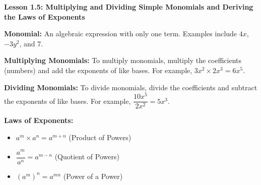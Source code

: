 \begin{center}
\textbf{Lesson 1.5: Multiplying and Dividing Simple Monomials and Deriving the Laws of Exponents}
\end{center}

\vspace*{1ex}

    \textbf{Monomial:} An algebraic expression with only one term. Examples include \( 4x \), \( -3y^2 \), and \( 7 \).
     
    \textbf{Multiplying Monomials:} To multiply monomials, multiply the coefficients (numbers) and add the exponents of like bases. For example, \( 3x^2 \times 2x^3 = 6x^5 \).
     
    \textbf{Dividing Monomials:} To divide monomials, divide the coefficients and subtract the exponents of like bases. For example, \( \dfrac{10x^5}{2x^2} = 5x^3 \).
     
    \textbf{Laws of Exponents:} 
    \begin{itemize}
        \item \( a^m \times a^n = a^{m+n} \) (Product of Powers)
        \item \( \dfrac{a^m}{a^n} = a^{m-n} \) (Quotient of Powers)
        \item \( (a^m)^n = a^{mn} \) (Power of a Power)
    \end{itemize}


 

 


